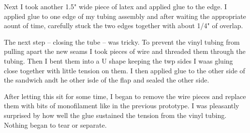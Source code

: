\documentclass[11pt]{report}
\begin{document}
Next I took another 1.5" wide piece of latex and applied glue to the edge. I applied glue to one edge of my tubing assembly and after waiting the appropriate aount of time, carefully stuck the two edges together with about 1/4" of overlap. 

The next step -- closing the tube -- was tricky. To prevent the vinyl tubing from pulling apart the new seams I took pieces of wire and threaded them through the tubing. Then I bent them into a U shape keeping the twp sides I waas gluing close together with little tension on them. I then applied glue to the other side of the sandwich andt he other isde of the flap and sealed the other side. 

After letting this sit for some time, I began to remove the wire pieces and replace them with bits of monofilament like in the previous prototype. I was pleasantly surprised by how well the glue sustained the tension from the vinyl tubing. Nothing began to tear or separate. 
\end{document}
